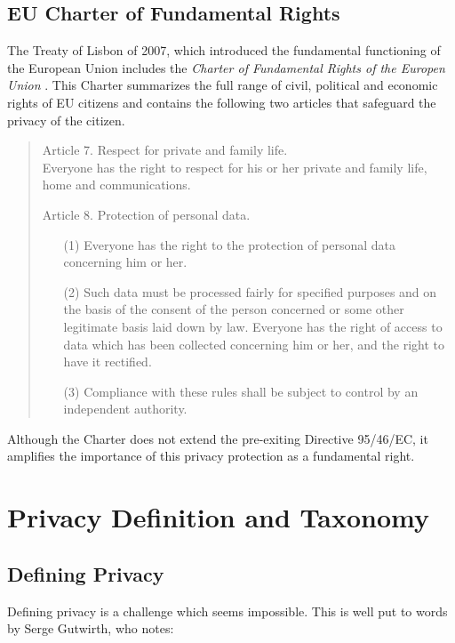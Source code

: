 \subsection{EU Charter of Fundamental Rights}
The Treaty of Lisbon of 2007, which introduced the fundamental functioning of the European Union
includes the \emph{Charter of Fundamental Rights of the Europen Union} \cite{EUFR2010}.
This Charter summarizes the full range of civil, political and economic rights of EU citizens and contains the following two articles that safeguard the privacy of the citizen.

\begin{quote}
  Article 7. Respect for private and family life.\\
  Everyone has the right to respect for his or her private and family life, home and communications.

  Article 8. Protection of personal data.
  \begin{enumerate}
    \item [(1)] Everyone has the right to the protection of personal data concerning him or her.
    \item [(2)] Such data must be processed fairly for specified purposes and on the basis of the consent of the person concerned or some other legitimate basis laid down by law.
      Everyone has the right of access to data which has been collected concerning him or her, and the right to have it rectified.
    \item [(3)] Compliance with these rules shall be subject to control by an independent authority.
  \end{enumerate}
\end{quote}

Although the Charter does not extend the pre-exiting Directive 95/46/EC, it amplifies the importance of this privacy protection as a fundamental right.

\section{Privacy Definition and Taxonomy}
\label{sec:taxonomy}

\subsection{Defining Privacy}


Defining privacy is a challenge which seems impossible. This is well put to words by Serge Gutwirth, who notes:

